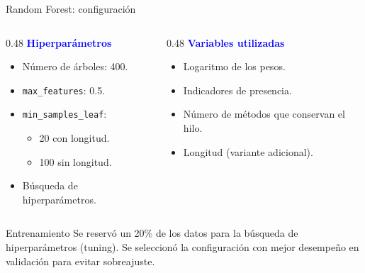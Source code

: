 \documentclass[12pt, aspectratio=43]{beamer}
\begin{document}
\begin{frame}{Random Forest: configuración}

\begin{columns}[T,onlytextwidth]

\begin{column}{0.48\textwidth}
\textbf{\textcolor{blue}{Hiperparámetros}}

\begin{itemize}
    \item Número de árboles: 400.
    \item \texttt{max\_features}: 0.5.
    \item \texttt{min\_samples\_leaf}:
    \begin{itemize}
        \item 20 con longitud.
        \item 100 sin longitud.
    \end{itemize}
    \item Búsqueda de hiperparámetros.
\end{itemize}
\end{column}

\begin{column}{0.48\textwidth}
\textbf{\textcolor{blue}{Variables utilizadas}}

\begin{itemize}
    \item Logaritmo de los pesos.
    \item Indicadores de presencia.
    \item Número de métodos que conservan el hilo.
    \item Longitud (variante adicional).
\end{itemize}
\end{column}

\end{columns}

\vspace{0.4cm}

\begin{block}{Entrenamiento}
Se reservó un 20\% de los datos para la búsqueda de hiperparámetros (tuning). Se seleccionó la configuración con mejor desempeño en validación para evitar sobreajuste.
\end{block}

\end{frame}
\end{document}
